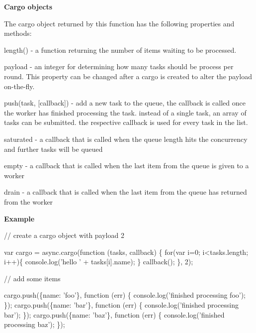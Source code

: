 {\bfseries Cargo objects}

The cargo object returned by this function has the following properties and methods\+:


\begin{DoxyItemize}
\item length() -\/ a function returning the number of items waiting to be processed.
\item payload -\/ an integer for determining how many tasks should be process per round. This property can be changed after a cargo is created to alter the payload on-\/the-\/fly.
\item push(task, \mbox{[}callback\mbox{]}) -\/ add a new task to the queue, the callback is called once the worker has finished processing the task. instead of a single task, an array of tasks can be submitted. the respective callback is used for every task in the list.
\item saturated -\/ a callback that is called when the queue length hits the concurrency and further tasks will be queued
\item empty -\/ a callback that is called when the last item from the queue is given to a worker
\item drain -\/ a callback that is called when the last item from the queue has returned from the worker
\end{DoxyItemize}

{\bfseries Example}


\begin{DoxyCode}
\textcolor{comment}{// create a cargo object with payload 2}

var cargo = async.cargo(\textcolor{keyword}{function} (tasks, callback) \{
    \textcolor{keywordflow}{for}(var i=0; i<tasks.length; i++)\{
      console.log(\textcolor{stringliteral}{'hello '} + tasks[i].name);
    \}
    callback();
\}, 2);


\textcolor{comment}{// add some items}

cargo.push(\{name: \textcolor{stringliteral}{'foo'}\}, \textcolor{keyword}{function} (err) \{
    console.log(\textcolor{stringliteral}{'finished processing foo'});
\});
cargo.push(\{name: \textcolor{stringliteral}{'bar'}\}, \textcolor{keyword}{function} (err) \{
    console.log(\textcolor{stringliteral}{'finished processing bar'});
\});
cargo.push(\{name: \textcolor{stringliteral}{'baz'}\}, \textcolor{keyword}{function} (err) \{
    console.log(\textcolor{stringliteral}{'finished processing baz'});
\});
\end{DoxyCode}
 



